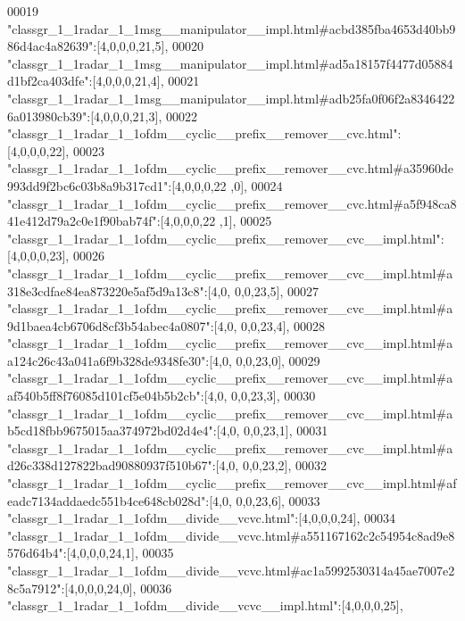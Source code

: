 \begin{DoxyCode}
00019 \textcolor{stringliteral}{"classgr\_1\_1radar\_1\_1msg\_\_manipulator\_\_impl.html#acbd385fba4653d40bb986d4ac4a82639"}:[4,0,0,0,21,5],
00020 \textcolor{stringliteral}{"classgr\_1\_1radar\_1\_1msg\_\_manipulator\_\_impl.html#ad5a18157f4477d05884d1bf2ca403dfe"}:[4,0,0,0,21,4],
00021 \textcolor{stringliteral}{"classgr\_1\_1radar\_1\_1msg\_\_manipulator\_\_impl.html#adb25fa0f06f2a83464226a013980cb39"}:[4,0,0,0,21,3],
00022 \textcolor{stringliteral}{"classgr\_1\_1radar\_1\_1ofdm\_\_cyclic\_\_prefix\_\_remover\_\_cvc.html"}:[4,0,0,0,22],
00023 \textcolor{stringliteral}{"classgr\_1\_1radar\_1\_1ofdm\_\_cyclic\_\_prefix\_\_remover\_\_cvc.html#a35960de993dd9f2bc6c03b8a9b317cd1"}:[4,0,0,0,22
      ,0],
00024 \textcolor{stringliteral}{"classgr\_1\_1radar\_1\_1ofdm\_\_cyclic\_\_prefix\_\_remover\_\_cvc.html#a5f948ca841e412d79a2c0e1f90bab74f"}:[4,0,0,0,22
      ,1],
00025 \textcolor{stringliteral}{"classgr\_1\_1radar\_1\_1ofdm\_\_cyclic\_\_prefix\_\_remover\_\_cvc\_\_impl.html"}:[4,0,0,0,23],
00026 \textcolor{stringliteral}{"classgr\_1\_1radar\_1\_1ofdm\_\_cyclic\_\_prefix\_\_remover\_\_cvc\_\_impl.html#a318e3cdfae84ea873220e5af5d9a13c8"}:[4,0,
      0,0,23,5],
00027 \textcolor{stringliteral}{"classgr\_1\_1radar\_1\_1ofdm\_\_cyclic\_\_prefix\_\_remover\_\_cvc\_\_impl.html#a9d1baea4cb6706d8cf3b54abec4a0807"}:[4,0,
      0,0,23,4],
00028 \textcolor{stringliteral}{"classgr\_1\_1radar\_1\_1ofdm\_\_cyclic\_\_prefix\_\_remover\_\_cvc\_\_impl.html#aa124c26c43a041a6f9b328de9348fe30"}:[4,0,
      0,0,23,0],
00029 \textcolor{stringliteral}{"classgr\_1\_1radar\_1\_1ofdm\_\_cyclic\_\_prefix\_\_remover\_\_cvc\_\_impl.html#aaf540b5ff8f76085d101cf5e04b5b2cb"}:[4,0,
      0,0,23,3],
00030 \textcolor{stringliteral}{"classgr\_1\_1radar\_1\_1ofdm\_\_cyclic\_\_prefix\_\_remover\_\_cvc\_\_impl.html#ab5cd18fbb9675015aa374972bd02d4e4"}:[4,0,
      0,0,23,1],
00031 \textcolor{stringliteral}{"classgr\_1\_1radar\_1\_1ofdm\_\_cyclic\_\_prefix\_\_remover\_\_cvc\_\_impl.html#ad26c338d127822bad90880937f510b67"}:[4,0,
      0,0,23,2],
00032 \textcolor{stringliteral}{"classgr\_1\_1radar\_1\_1ofdm\_\_cyclic\_\_prefix\_\_remover\_\_cvc\_\_impl.html#afeadc7134addaedc551b4ce648cb028d"}:[4,0,
      0,0,23,6],
00033 \textcolor{stringliteral}{"classgr\_1\_1radar\_1\_1ofdm\_\_divide\_\_vcvc.html"}:[4,0,0,0,24],
00034 \textcolor{stringliteral}{"classgr\_1\_1radar\_1\_1ofdm\_\_divide\_\_vcvc.html#a551167162c2c54954c8ad9e8576d64b4"}:[4,0,0,0,24,1],
00035 \textcolor{stringliteral}{"classgr\_1\_1radar\_1\_1ofdm\_\_divide\_\_vcvc.html#ac1a5992530314a45ae7007e28c5a7912"}:[4,0,0,0,24,0],
00036 \textcolor{stringliteral}{"classgr\_1\_1radar\_1\_1ofdm\_\_divide\_\_vcvc\_\_impl.html"}:[4,0,0,0,25],

\end{DoxyCode}
